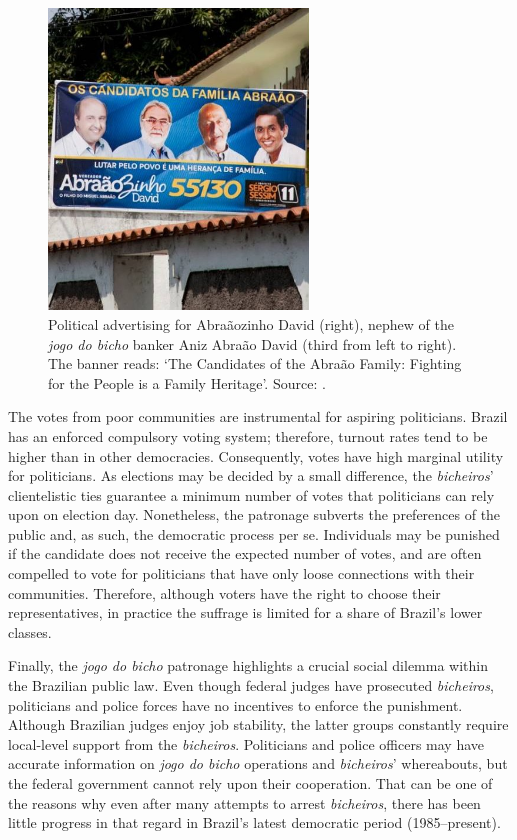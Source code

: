 \begin{figure}[!htbp]
	\centering
	\includegraphics[width=.6\textwidth, height=8cm]{images/bicho08.jpg}
	\caption{Political advertising for Abraãozinho David (right), nephew of the \emph{jogo do bicho} banker Aniz Abraão David (third from left to right). The banner reads: `The Candidates of the Abraão Family: Fighting for the People is a Family Heritage'. Source: \citet{extra2012aniz}.}
	\label{fig:aniz}
\end{figure}

The votes from poor communities are instrumental for aspiring politicians. Brazil has an enforced compulsory voting system; therefore, turnout rates tend to be higher than in other democracies. Consequently, votes have high marginal utility for politicians. As elections may be decided by a small difference, the \emph{bicheiros}' clientelistic ties guarantee a minimum number of votes that politicians can rely upon on election day. Nonetheless, the patronage subverts the preferences of the public and, as such, the democratic process per se. Individuals may be punished if the candidate does not receive the expected number of votes, and are often compelled to vote for politicians that have only loose connections with their communities. Therefore, although voters have the right to choose their representatives, in practice the suffrage is limited for a share of Brazil’s lower classes.

Finally, the \emph{jogo do bicho} patronage highlights a crucial social dilemma within the Brazilian public law. Even though federal judges have prosecuted \emph{bicheiros}, politicians and police forces have no incentives to enforce the punishment. Although Brazilian judges enjoy job stability, the latter groups constantly require local-level support from the \emph{bicheiros}. Politicians and police officers may have accurate information on \emph{jogo do bicho} operations and \emph{bicheiros}' whereabouts, but the federal government cannot rely upon their cooperation. That can be one of the reasons why even after many attempts to arrest \emph{bicheiros}, there has been little progress in that regard in Brazil's latest democratic period (1985--present).

